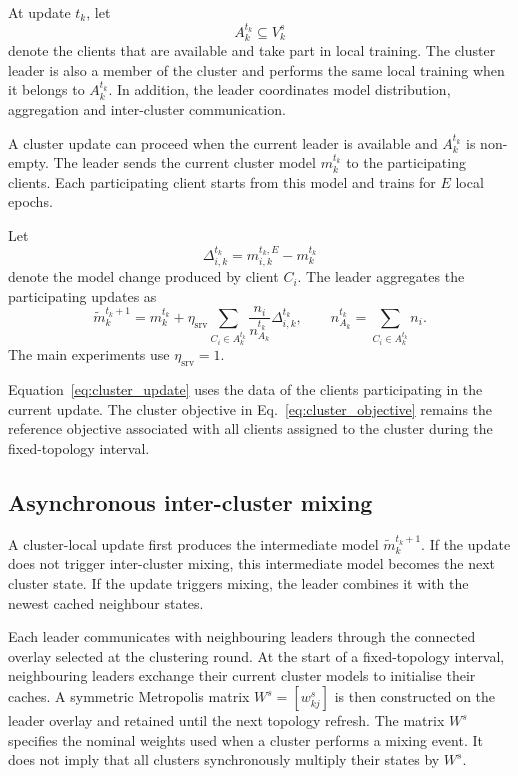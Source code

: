 \documentclass[pdflatex,sn-mathphys-num]{sn-jnl}
\begin{document}
At update \(t_k\), let
\[
A_k^{t_k}
\subseteq
V_k^s
\]
denote the clients that are available and take part in local training. The cluster leader is also a member of the cluster and performs the same local training when it belongs to \(A_k^{t_k}\). In addition, the leader coordinates model distribution, aggregation and inter-cluster communication.

A cluster update can proceed when the current leader is available and \(A_k^{t_k}\) is non-empty. The leader sends the current cluster model \(m_k^{t_k}\) to the participating clients. Each participating client starts from this model and trains for \(E\) local epochs.

Let
\[
\Delta_{i,k}^{t_k}
=
m_{i,k}^{t_k,E}
-
m_k^{t_k}
\]
denote the model change produced by client \(C_i\). The leader aggregates the participating updates as
\begin{equation}
\widetilde{m}_k^{t_k+1}
=
m_k^{t_k}
+
\eta_{\mathrm{srv}}
\sum_{C_i\in A_k^{t_k}}
\frac{n_i}{n_{A_k}^{t_k}}
\Delta_{i,k}^{t_k},
\qquad
n_{A_k}^{t_k}
=
\sum_{C_i\in A_k^{t_k}}n_i .
\label{eq:cluster_update}
\end{equation}
The main experiments use \(\eta_{\mathrm{srv}}=1\).

Equation~\eqref{eq:cluster_update} uses the data of the clients participating in the current update. The cluster objective in Eq.~\eqref{eq:cluster_objective} remains the reference objective associated with all clients assigned to the cluster during the fixed-topology interval.


\subsection{Asynchronous inter-cluster mixing}
\label{subsec:asynchronous_mixing}

A cluster-local update first produces the intermediate model \(\widetilde{m}_k^{t_k+1}\). If the update does not trigger inter-cluster mixing, this intermediate model becomes the next cluster state. If the update triggers mixing, the leader combines it with the newest cached neighbour states.

Each leader communicates with neighbouring leaders through the connected overlay selected at the clustering round. At the start of a fixed-topology interval, neighbouring leaders exchange their current cluster models to initialise their caches. A symmetric Metropolis matrix \(W^s=[w_{kj}^s]\) is then constructed on the leader overlay and retained until the next topology refresh. The matrix \(W^s\) specifies the nominal weights used when a cluster performs a mixing event. It does not imply that all clusters synchronously multiply their states by \(W^s\).
\end{document}
